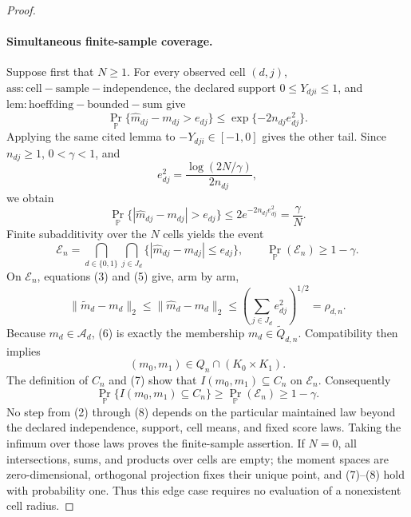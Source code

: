\documentclass{article}
\begin{document}
\begin{proof}
\paragraph{Simultaneous finite-sample coverage.}
Suppose first that \(N\geq1\).  For every observed cell \((d,j)\), \(\mathrm{ass:cell-sample-independence}\), the declared support \(0\leq Y_{dji}\leq1\), and \(\mathrm{lem:hoeffding-bounded-sum}\) give
\[
 \Pr_{\mathbb P}\{\widehat m_{dj}-m_{dj}>e_{dj}\}
 \leq \exp\{-2n_{dj}e_{dj}^{2}\}.
\]
Applying the same cited lemma to \(-Y_{dji}\in[-1,0]\) gives the other tail.  Since \(n_{dj}\geq1\), \(0<\gamma<1\), and
\[
 e_{dj}^{2}=\frac{\log(2N/\gamma)}{2n_{dj}},
\]
we obtain
\[
 \Pr_{\mathbb P}\{|\widehat m_{dj}-m_{dj}|>e_{dj}\}
 \leq2e^{-2n_{dj}e_{dj}^{2}}
 =\frac{\gamma}{N}.                                       \tag{4}
\]
Finite subadditivity over the \(N\) cells yields the event
\[
 \mathcal E_n
 =\bigcap_{d\in\{0,1\}}\bigcap_{j\in J_d}
   \{|\widehat m_{dj}-m_{dj}|\leq e_{dj}\},
 \qquad
 \Pr_{\mathbb P}(\mathcal E_n)\geq1-\gamma.               \tag{5}
\]
On \(\mathcal E_n\), equations (3) and (5) give, arm by arm,
\[
 \|\widetilde m_d-m_d\|_2
 \leq\|\widehat m_d-m_d\|_2
 \leq\left(\sum_{j\in J_d}e_{dj}^{2}\right)^{1/2}
 =\rho_{d,n}.                                               \tag{6}
\]
Because \(m_d\in\mathcal A_d\), (6) is exactly the membership \(m_d\in\widetilde Q_{d,n}\).  Compatibility then implies
\[
 (m_0,m_1)\in Q_n\cap(K_0\times K_1).                      \tag{7}
\]
The definition of \(C_n\) and (7) show that \(I(m_0,m_1)\subseteq C_n\) on \(\mathcal E_n\).  Consequently
\[
 \Pr_{\mathbb P}\{I(m_0,m_1)\subseteq C_n\}
 \geq\Pr_{\mathbb P}(\mathcal E_n)
 \geq1-\gamma.                                             \tag{8}
\]
No step from (2) through (8) depends on the particular maintained law beyond the declared independence, support, cell means, and fixed score laws.  Taking the infimum over those laws proves the finite-sample assertion.  If \(N=0\), all intersections, sums, and products over cells are empty; the moment spaces are zero-dimensional, orthogonal projection fixes their unique point, and (7)--(8) hold with probability one.  Thus this edge case requires no evaluation of a nonexistent cell radius.


\end{proof}
\end{document}
